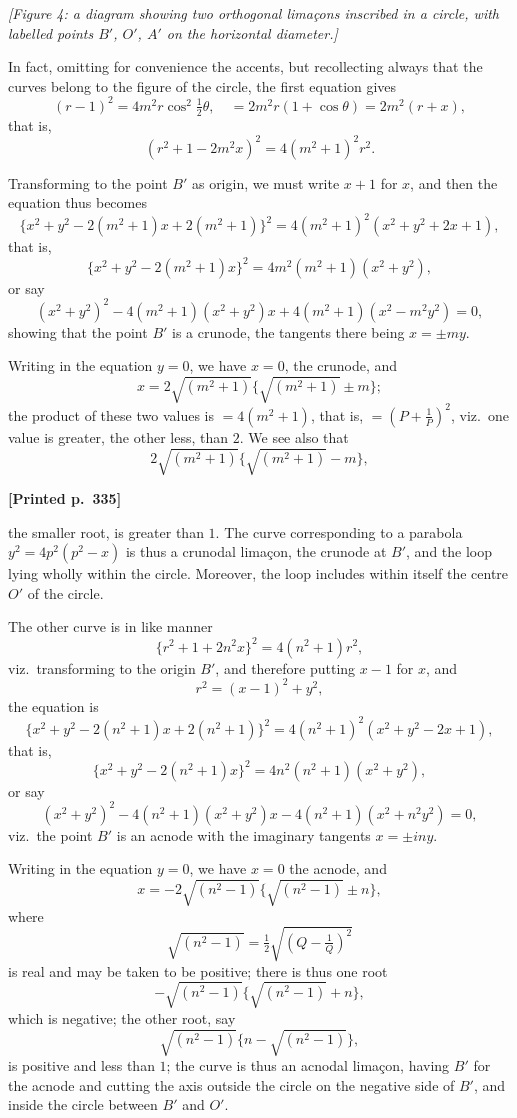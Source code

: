 \documentclass[11pt]{article}
\begin{document}
\textit{[Figure 4: a diagram showing two orthogonal lima\c{c}ons inscribed in a circle, with labelled points $B'$, $O'$, $A'$ on the horizontal diameter.]}

\medskip

In fact, omitting for convenience the accents, but recollecting always that the curves belong to the figure of the circle, the first equation gives
\[
(r-1)^{2} = 4m^{2}r\cos^{2}\tfrac{1}{2}\theta,\quad = 2m^{2}r(1+\cos\theta) = 2m^{2}(r+x),
\]
that is,
\[
(r^{2}+1-2m^{2}x)^{2} = 4(m^{2}+1)^{2} r^{2}.
\]

Transforming to the point $B'$ as origin, we must write $x+1$ for $x$, and then the equation thus becomes
\[
\bigl\{x^{2}+y^{2}-2(m^{2}+1)x + 2(m^{2}+1)\bigr\}^{2} = 4(m^{2}+1)^{2}(x^{2}+y^{2}+2x+1),
\]
that is,
\[
\bigl\{x^{2}+y^{2}-2(m^{2}+1)x\bigr\}^{2} = 4m^{2}(m^{2}+1)(x^{2}+y^{2}),
\]
or say
\[
(x^{2}+y^{2})^{2} - 4(m^{2}+1)(x^{2}+y^{2})x + 4(m^{2}+1)(x^{2}-m^{2}y^{2}) = 0,
\]
showing that the point $B'$ is a crunode, the tangents there being $x=\pm my$.

Writing in the equation $y=0$, we have $x=0$, the crunode, and
\[
x = 2\sqrt{(m^{2}+1)}\bigl\{\sqrt{(m^{2}+1)}\pm m\bigr\};
\]
the product of these two values is $=4(m^{2}+1)$, that is, $=\left(P+\tfrac{1}{P}\right)^{2}$, viz.\ one value is greater, the other less, than $2$. We see also that
\[
2\sqrt{(m^{2}+1)}\bigl\{\sqrt{(m^{2}+1)}-m\bigr\},
\]

\medskip

\noindent\textbf{[Printed p.~335]}\hfill

\noindent the smaller root, is greater than $1$. The curve corresponding to a parabola $y^{2}=4p^{2}(p^{2}-x)$ is thus a crunodal lima\c{c}on, the crunode at $B'$, and the loop lying wholly within the circle. Moreover, the loop includes within itself the centre $O'$ of the circle.

The other curve is in like manner
\[
\bigl\{r^{2}+1+2n^{2}x\bigr\}^{2} = 4(n^{2}+1)r^{2},
\]
viz.\ transforming to the origin $B'$, and therefore putting $x-1$ for $x$, and
\[
r^{2} = (x-1)^{2}+y^{2},
\]
the equation is
\[
\bigl\{x^{2}+y^{2}-2(n^{2}+1)x + 2(n^{2}+1)\bigr\}^{2} = 4(n^{2}+1)^{2}(x^{2}+y^{2}-2x+1),
\]
that is,
\[
\bigl\{x^{2}+y^{2}-2(n^{2}+1)x\bigr\}^{2} = 4n^{2}(n^{2}+1)(x^{2}+y^{2}),
\]
or say
\[
(x^{2}+y^{2})^{2} - 4(n^{2}+1)(x^{2}+y^{2})x - 4(n^{2}+1)(x^{2}+n^{2}y^{2}) = 0,
\]
viz.\ the point $B'$ is an acnode with the imaginary tangents $x=\pm iny$.

Writing in the equation $y=0$, we have $x=0$ the acnode, and
\[
x = -2\sqrt{(n^{2}-1)}\bigl\{\sqrt{(n^{2}-1)}\pm n\bigr\},
\]
where
\[
\sqrt{(n^{2}-1)} = \tfrac{1}{2}\sqrt{\left(Q-\tfrac{1}{Q}\right)^{2}}
\]
is real and may be taken to be positive; there is thus one root
\[
-\sqrt{(n^{2}-1)}\bigl\{\sqrt{(n^{2}-1)}+n\bigr\},
\]
which is negative; the other root, say
\[
\sqrt{(n^{2}-1)}\bigl\{n - \sqrt{(n^{2}-1)}\bigr\},
\]
is positive and less than $1$; the curve is thus an acnodal lima\c{c}on, having $B'$ for the acnode and cutting the axis outside the circle on the negative side of $B'$, and inside the circle between $B'$ and $O'$.
\end{document}

